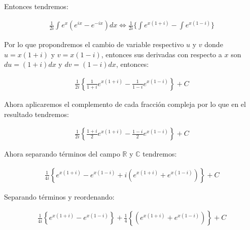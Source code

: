 Entonces tendremos:

\begin{equation*}
    \begin{gathered}
        \frac{1}{2i}\int e^{x}(e^{ix}-e^{-ix})dx \Leftrightarrow \frac{1}{2i}\{\int e^{x(1+i)} - \int e^{x(1-i)}\}
    \end{gathered}
\end{equation*}

Por lo que propondremos el cambio de variable respectivo \(\displaystyle u\) y \(\displaystyle v\) donde \(\displaystyle u=x(1+i)\) y \(\displaystyle v=x(1-i)\), entonces sus derivadas con respecto a \(\displaystyle x\) son \(\displaystyle du=(1+i)dx\) y \(\displaystyle dv=(1-i)dx\), entonces:

\begin{equation*}
    \begin{gathered}
        \frac{1}{2i}\left\{\frac{1}{1+i}e^{x(1+i)}-\frac{1}{1-i}e^{x(1-i)}\right\}+C
    \end{gathered}
\end{equation*}

Ahora aplicaremos el complemento de cada fracción compleja por lo que en el resultado tendremos:

\begin{equation*}
    \begin{gathered}
        \frac{1}{2i}\left\{\frac{1+i}{2}e^{x(1+i)}-\frac{1-i}{2}e^{x(1-i)}\right\}+C
    \end{gathered}
\end{equation*}

Ahora separando términos del campo \(\displaystyle\mathbb{R}\) y \(\displaystyle\mathbb{C}\) tendremos:

\begin{equation*}
    \begin{gathered}
        \frac{1}{4i}\left\{e^{x(1+i)}-e^{x(1-i)} + i(e^{x(1+i)}+e^{x(1-i)})\right\}+C
    \end{gathered}
\end{equation*}

Separando términos y reordenando:

\begin{equation*}
    \begin{gathered}
        \frac{1}{4i}\left\{e^{x(1+i)}-e^{x(1-i)}\right\} + \frac{1}{4}\left\{(e^{x(1+i)}+e^{x(1-i)})\right\}+C
    \end{gathered}
\end{equation*}

